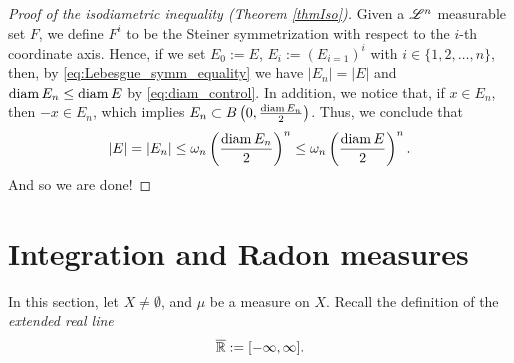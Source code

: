 \begin{proof}[Proof of the isodiametric inequality (Theorem \ref{thmIso})]
Given a $\mathscr{L}^{n}$ measurable set $F$, we define $F^i$ to be the Steiner
symmetrization with respect to the $i$-th coordinate axis. Hence, if we set $E_0 := E$, $E_i := (E_{i=1})^i$ with $i \in \{1,2,\dots,n\}$, then, by \eqref{eq:Lebesgue_symm_equality} we have $|E_n| = |E|$ and $\operatorname{diam} E_n \leq \operatorname{diam} E$ by \eqref{eq:diam_control}. In addition, we notice that, if $x\in E_n$, then $-x \in E_n$, which implies $E_n \subset B\left(0,\frac{\operatorname{diam} E_n}{2}\right)$. Thus, we conclude that
\begin{equation*}
|E| = |E_{n}| \le \omega_{n} \left ( \frac{\operatorname{diam} E_{n}}{2} \right )^{n} \le \omega_{n} \left ( \frac{\operatorname{diam} E}{2} \right )^{n}.
\end{equation*}
And so we are done!
\end{proof}

\section{Integration and Radon measures}
 
In this section, let $X \neq \emptyset$, and $\mu$ be a measure on $X$. Recall the definition of the {\em extended real line} $$\overline{\mathbb{R}}:= [-\infty,\infty].$$

